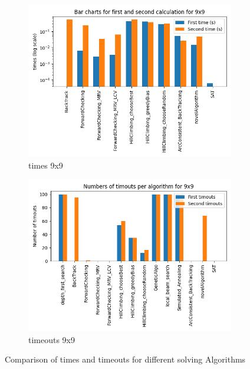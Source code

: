 \begin{figure}[h!]
    \centering

    \begin{subfigure}[b]{0.8\textwidth}
        \includegraphics[width=\textwidth]{Pictures/times_9x9}
        \caption{times 9x9}
    \end{subfigure}
    \hfill
    \begin{subfigure}[b]{0.8\textwidth}
        \includegraphics[width=\linewidth]{Pictures/timeouts_9x9}
        \caption{timeouts 9x9}
    \end{subfigure}

    \caption{Comparison of times and timeouts for different solving Algorithms}
\end{figure}

